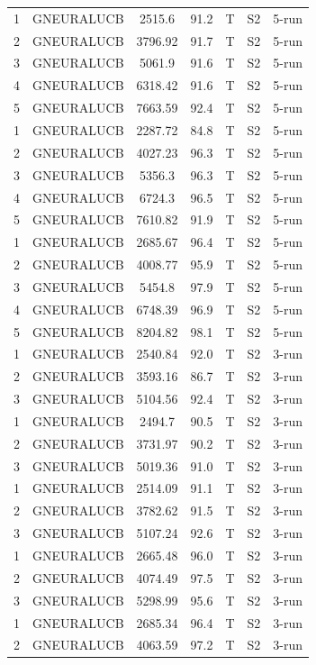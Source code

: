 \documentclass[11pt]{article}
\begin{document}
\begin{center}
\begin{longtable}{|c|c|c|c|c|c|c|}
1 & GNEURALUCB & 2515.6 & 91.2 & T & S2 & 5-run \\
2 & GNEURALUCB & 3796.92 & 91.7 & T & S2 & 5-run \\
3 & GNEURALUCB & 5061.9 & 91.6 & T & S2 & 5-run \\
4 & GNEURALUCB & 6318.42 & 91.6 & T & S2 & 5-run \\
5 & GNEURALUCB & 7663.59 & 92.4 & T & S2 & 5-run \\
1 & GNEURALUCB & 2287.72 & 84.8 & T & S2 & 5-run \\
2 & GNEURALUCB & 4027.23 & 96.3 & T & S2 & 5-run \\
3 & GNEURALUCB & 5356.3 & 96.3 & T & S2 & 5-run \\
4 & GNEURALUCB & 6724.3 & 96.5 & T & S2 & 5-run \\
5 & GNEURALUCB & 7610.82 & 91.9 & T & S2 & 5-run \\
1 & GNEURALUCB & 2685.67 & 96.4 & T & S2 & 5-run \\
2 & GNEURALUCB & 4008.77 & 95.9 & T & S2 & 5-run \\
3 & GNEURALUCB & 5454.8 & 97.9 & T & S2 & 5-run \\
4 & GNEURALUCB & 6748.39 & 96.9 & T & S2 & 5-run \\
5 & GNEURALUCB & 8204.82 & 98.1 & T & S2 & 5-run \\
1 & GNEURALUCB & 2540.84 & 92.0 & T & S2 & 3-run \\
2 & GNEURALUCB & 3593.16 & 86.7 & T & S2 & 3-run \\
3 & GNEURALUCB & 5104.56 & 92.4 & T & S2 & 3-run \\
1 & GNEURALUCB & 2494.7 & 90.5 & T & S2 & 3-run \\
2 & GNEURALUCB & 3731.97 & 90.2 & T & S2 & 3-run \\
3 & GNEURALUCB & 5019.36 & 91.0 & T & S2 & 3-run \\
1 & GNEURALUCB & 2514.09 & 91.1 & T & S2 & 3-run \\
2 & GNEURALUCB & 3782.62 & 91.5 & T & S2 & 3-run \\
3 & GNEURALUCB & 5107.24 & 92.6 & T & S2 & 3-run \\
1 & GNEURALUCB & 2665.48 & 96.0 & T & S2 & 3-run \\
2 & GNEURALUCB & 4074.49 & 97.5 & T & S2 & 3-run \\
3 & GNEURALUCB & 5298.99 & 95.6 & T & S2 & 3-run \\
1 & GNEURALUCB & 2685.34 & 96.4 & T & S2 & 3-run \\
2 & GNEURALUCB & 4063.59 & 97.2 & T & S2 & 3-run \\

\end{longtable}
\end{center}
\end{document}
